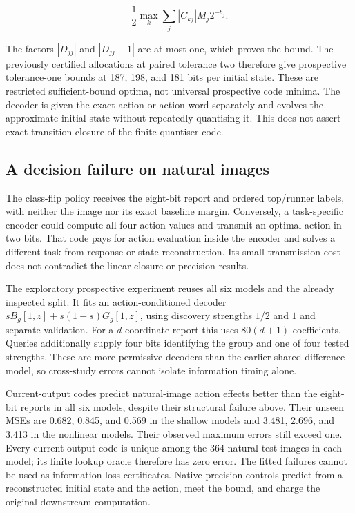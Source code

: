 \documentclass[
  british,
  11pt,
  a4paper,
]{article}
\begin{document}
\[\frac12\max_k\sum_j|C_{kj}|M_j2^{-b_j}.\]

The factors \(|D_{jj}|\) and \(|D_{jj}-1|\) are at most one, which
proves the bound. The previously certified allocations at paired
tolerance two therefore give prospective tolerance-one bounds at 187,
198, and 181 bits per initial state. These are restricted
sufficient-bound optima, not universal prospective code minima. The
decoder is given the exact action or action word separately and evolves
the approximate initial state without repeatedly quantising it. This
does not assert exact transition closure of the finite quantiser code.

\subsection{A decision failure on natural
images}\label{a-decision-failure-on-natural-images}

The class-flip policy receives the eight-bit report and ordered
top/runner labels, with neither the image nor its exact baseline margin.
Conversely, a task-specific encoder could compute all four action values
and transmit an optimal action in two bits. That code pays for action
evaluation inside the encoder and solves a different task from response
or state reconstruction. Its small transmission cost does not contradict
the linear closure or precision results.

The exploratory prospective experiment reuses all six models and the
already inspected split. It fits an action-conditioned decoder
\(sB_g[1,z]+s(1-s)G_g[1,z]\), using discovery strengths \(1/2\) and
\(1\) and separate validation. For a \(d\)-coordinate report this uses
\(80(d+1)\) coefficients. Queries additionally supply four bits
identifying the group and one of four tested strengths. These are more
permissive decoders than the earlier shared difference model, so
cross-study errors cannot isolate information timing alone.

Current-output codes predict natural-image action effects better than
the eight-bit reports in all six models, despite their structural
failure above. Their unseen MSEs are 0.682, 0.845, and 0.569 in the
shallow models and 3.481, 2.696, and 3.413 in the nonlinear models.
Their observed maximum errors still exceed one. Every current-output
code is unique among the 364 natural test images in each model; its
finite lookup oracle therefore has zero error. The fitted failures
cannot be used as information-loss certificates. Native precision
controls predict from a reconstructed initial state and the action, meet
the bound, and charge the original downstream computation.
\end{document}
